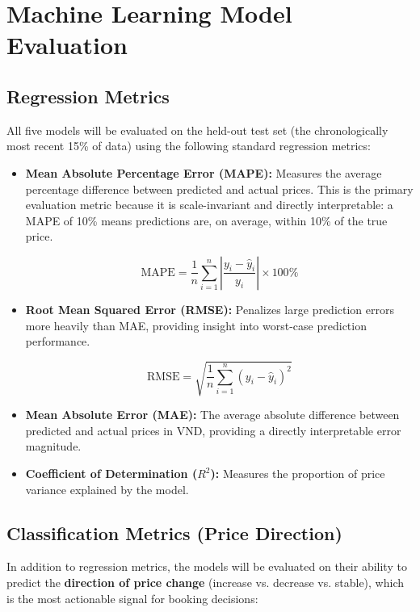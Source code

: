 \documentclass[12pt,a4paper]{report}
\begin{document}
\section{Machine Learning Model Evaluation}

\subsection{Regression Metrics}

All five models will be evaluated on the held-out test set (the chronologically most recent 15\% of data) using the following standard regression metrics:

\begin{itemize}
    \item \textbf{Mean Absolute Percentage Error (MAPE):} Measures the average percentage difference between predicted and actual prices. This is the primary evaluation metric because it is scale-invariant and directly interpretable: a MAPE of 10\% means predictions are, on average, within 10\% of the true price.
    
    \[
    \text{MAPE} = \frac{1}{n} \sum_{i=1}^{n} \left| \frac{y_i - \hat{y}_i}{y_i} \right| \times 100\%
    \]
    
    \item \textbf{Root Mean Squared Error (RMSE):} Penalizes large prediction errors more heavily than MAE, providing insight into worst-case prediction performance.
    
    \[
    \text{RMSE} = \sqrt{\frac{1}{n} \sum_{i=1}^{n} (y_i - \hat{y}_i)^2}
    \]
    
    \item \textbf{Mean Absolute Error (MAE):} The average absolute difference between predicted and actual prices in VND, providing a directly interpretable error magnitude.
    
    \item \textbf{Coefficient of Determination ($R^2$):} Measures the proportion of price variance explained by the model.
\end{itemize}

\subsection{Classification Metrics (Price Direction)}

In addition to regression metrics, the models will be evaluated on their ability to predict the \textbf{direction of price change} (increase vs. decrease vs. stable), which is the most actionable signal for booking decisions:
\end{document}
